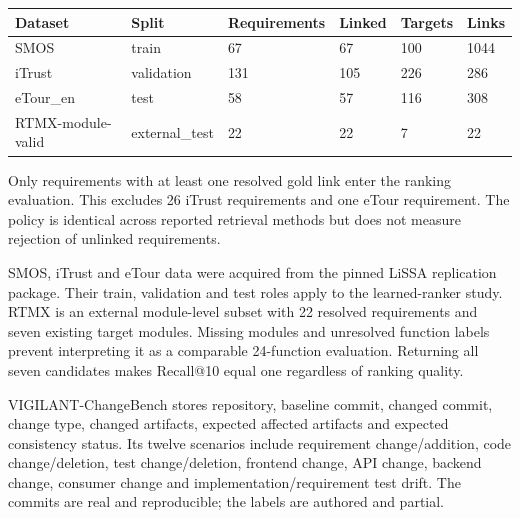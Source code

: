 \documentclass[
  11pt,
  a4paper,
]{report}
\begin{document}
\begin{longtable}[]{@{}llllll@{}}
\toprule\noalign{}
Dataset & Split & Requirements & Linked & Targets & Links \\
\midrule\noalign{}
\endhead
\bottomrule\noalign{}
\endlastfoot
SMOS & train & 67 & 67 & 100 & 1044 \\
iTrust & validation & 131 & 105 & 226 & 286 \\
eTour\_en & test & 58 & 57 & 116 & 308 \\
RTMX-module-valid & external\_test & 22 & 22 & 7 & 22 \\
\end{longtable}

Only requirements with at least one resolved gold link enter the ranking
evaluation. This excludes 26 iTrust requirements and one eTour
requirement. The policy is identical across reported retrieval methods
but does not measure rejection of unlinked requirements.

SMOS, iTrust and eTour data were acquired from the pinned LiSSA
replication package. Their train, validation and test roles apply to the
learned-ranker study. RTMX is an external module-level subset with 22
resolved requirements and seven existing target modules. Missing modules
and unresolved function labels prevent interpreting it as a comparable
24-function evaluation. Returning all seven candidates makes Recall@10
equal one regardless of ranking quality.

VIGILANT-ChangeBench stores repository, baseline commit, changed commit,
change type, changed artifacts, expected affected artifacts and expected
consistency status. Its twelve scenarios include requirement
change/addition, code change/deletion, test change/deletion, frontend
change, API change, backend change, consumer change and
implementation/requirement test drift. The commits are real and
reproducible; the labels are authored and partial.
\end{document}
